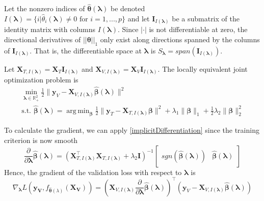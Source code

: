 \documentclass[12pt,letterpaper]{article}
\DeclareMathOperator*{\argmin}{arg\,min}
\begin{document}
Let the nonzero indices of $\hat{\boldsymbol{\theta}}(\boldsymbol{\lambda})$ be denoted $I(\boldsymbol\lambda) = \{i | \hat{\theta}_i(\boldsymbol\lambda) \ne 0 \text{ for } i=1,...,p \}$ and let $\boldsymbol I_{I(\boldsymbol \lambda)}$ be a submatrix of the identity matrix with columns $I(\boldsymbol\lambda)$. Since $|\cdot|$ is not differentiable at zero, the directional derivatives of $||\boldsymbol \theta||_1$ only exist along directions spanned by the columns of $\boldsymbol I_{I(\boldsymbol \lambda)}$. That is, the differentiable space at $\boldsymbol \lambda$ is $S_{\boldsymbol{\lambda}} = span(\boldsymbol I_{I(\boldsymbol \lambda)})$.

Let $\boldsymbol{X}_{T, I(\boldsymbol\lambda)} = \boldsymbol{X}_T \boldsymbol{I}_{I(\boldsymbol \lambda)}$ and $\boldsymbol{X}_{V, I(\boldsymbol\lambda)}  = \boldsymbol{X}_V \boldsymbol{I}_{I(\boldsymbol \lambda)}$. The locally equivalent joint optimization problem is
\begin{equation}
\begin{array}{c}
\min_{\boldsymbol{\lambda} \in \mathbb{R}^2_{+}} \frac{1}{2} \| \boldsymbol{y}_V - \boldsymbol{X}_{V, I(\boldsymbol \lambda)} \hat{\boldsymbol{\beta}} (\boldsymbol \lambda) \| ^2 \\
\text{s.t. }
\hat{\boldsymbol{\beta}} (\boldsymbol{\lambda}) = \argmin_{\boldsymbol \beta} \frac{1}{2} \| \boldsymbol{y}_T - \boldsymbol{X}_{T, I(\boldsymbol \lambda)} \boldsymbol \beta \| ^2
+ \lambda_1 \| \boldsymbol \beta \|_1
+ \frac{1}{2}\lambda_2 \| \boldsymbol \beta \|_2^2
\end{array}
\end{equation}

To calculate the gradient, we can apply \eqref{implicitDifferentiation} since the training criterion is now smooth
\begin{equation}
\frac{\partial}{\partial \boldsymbol \lambda} \hat{\boldsymbol{\beta}}(\boldsymbol{\lambda}) = 
\left ( 
\boldsymbol{X}_{T, I(\boldsymbol\lambda)}^\top \boldsymbol{X}_{T, I(\boldsymbol\lambda)} + \lambda_2 \boldsymbol{I}
\right )^{-1}
\begin{bmatrix}
sgn \left (\hat{\boldsymbol{\beta}} (\boldsymbol{\lambda}) \right ) &
\hat{\boldsymbol{\beta}} (\boldsymbol{\lambda})
\end{bmatrix}
\end{equation}
Hence, the gradient of the validation loss with respect to $\boldsymbol{\lambda}$ is
\begin{equation}
\nabla_{\boldsymbol \lambda} L(\boldsymbol{y_V}, f_{\hat{\boldsymbol{\theta}}(\lambda)}(\boldsymbol{X_V})) =
\left (
\boldsymbol{X}_{V, I(\boldsymbol\lambda)}
\frac{\partial}{\partial \boldsymbol \lambda} \hat{\boldsymbol{\beta}}(\boldsymbol{\lambda})
\right )^{\top}
\left (
\boldsymbol y_V - \boldsymbol{X}_{V, I(\boldsymbol\lambda)} \hat{\boldsymbol{\beta}} (\boldsymbol{\lambda})
\right )
\end{equation}
\end{document}
